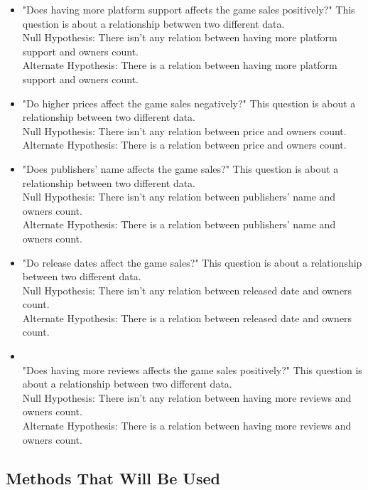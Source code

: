 \documentclass[conference]{IEEEtran}
\begin{document}
\begin{itemize}
    \item "Does having more platform support affects the game sales positively?" This question is about a relationship betwwen two different data.\\Null
Hypothesis: There isn't any relation between having more platform support and owners count.\\ Alternate Hypothesis: There is a relation between having more platform support and owners count. \\
    \item "Do higher prices affect the game sales negatively?" This question is about a relationship between two different data.\\Null
Hypothesis: There isn't any relation between price and owners count.\\ Alternate Hypothesis: There is a relation between price and owners count. \\
    \item "Does publishers' name affects the game sales?" This question is about a relationship between two different data.\\Null
Hypothesis: There isn't any relation between  publishers' name and owners count.\\ Alternate Hypothesis: There is a relation between  publishers' name and owners count. \\
    \item "Do release dates affect the game sales?" This question is about a relationship between two different data.\\Null
Hypothesis: There isn't any relation between released date and owners count.\\ Alternate Hypothesis: There is a relation between released date and owners count. \\
    \item \\"Does having more reviews affects the game sales positively?" This question is about a relationship between two different data.\\Null
Hypothesis: There isn't any relation between  having more reviews and owners count.\\ Alternate Hypothesis: There is a relation between  having more reviews and owners count. \\
\end{itemize}

\subsection{Methods That Will Be Used}
\end{document}
